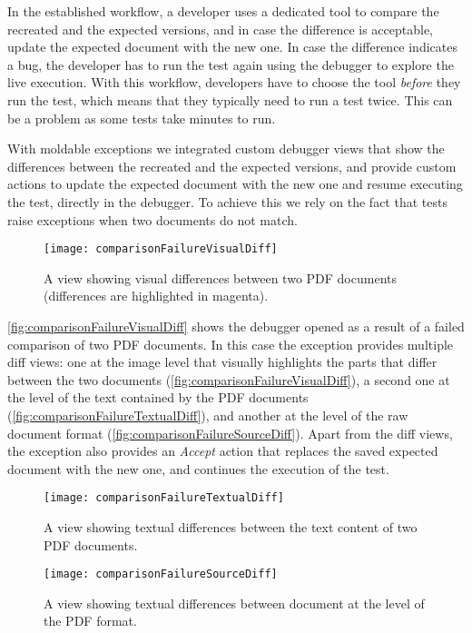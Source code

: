 \documentclass[sigplan,screen]{acmart} %
\begin{document}
In the established workflow, a developer uses a dedicated tool to compare the recreated and the expected versions, and in case the difference is acceptable, update the expected document with the new one.
In case the difference indicates a bug, the developer has to run the test again using the debugger to explore the live execution.
With this workflow, developers have to choose the tool \emph{before} they run the test, which means that they typically need to run a test twice.
This can be a problem as some tests take minutes to run.

With moldable exceptions we integrated custom debugger views that show the differences between the recreated and the expected versions, and provide custom actions to update the expected document with the new one and resume executing the test, directly in the debugger.
To achieve this we rely on the fact that tests raise  exceptions when two documents do not match.

\begin{figure*}[h]
  \texttt{[image: comparisonFailureVisualDiff]}
  \caption{A view showing visual differences between two PDF documents (differences are highlighted in magenta).}
  \label{fig:comparisonFailureVisualDiff}
\end{figure*}

\autoref{fig:comparisonFailureVisualDiff} shows the debugger opened as a result of a failed comparison of two PDF documents.
In this case the exception provides multiple diff views:
one at the image level that visually highlights the parts that differ between the two documents (\autoref{fig:comparisonFailureVisualDiff}),
a second one at the level of the text contained by the PDF documents (\autoref{fig:comparisonFailureTextualDiff}),
and another at the level of the raw document format (\autoref{fig:comparisonFailureSourceDiff}).
Apart from the diff views, the exception also provides an \emph{Accept} action that replaces the saved expected document with the new one, and continues the execution of the test.

\begin{figure}[h]
  \texttt{[image: comparisonFailureTextualDiff]}
  \caption{A view showing textual differences between the text content of two PDF documents.}
  \label{fig:comparisonFailureTextualDiff}
\end{figure}

\begin{figure}[h]
  \texttt{[image: comparisonFailureSourceDiff]}
  \caption{A view showing textual differences between document at the level of the PDF format.}
  \label{fig:comparisonFailureSourceDiff}
\end{figure}
\end{document}
